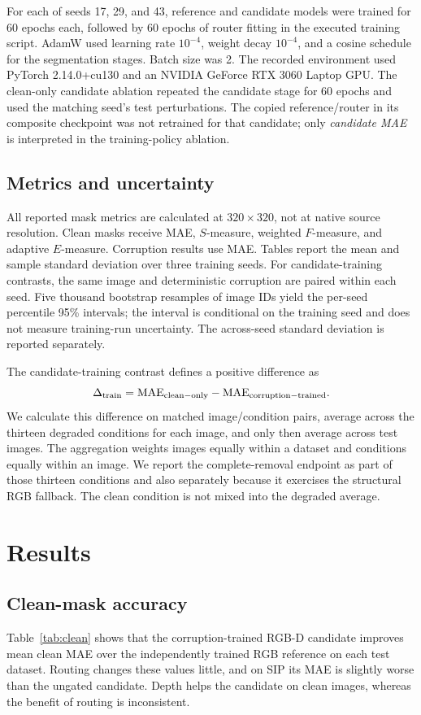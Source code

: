 \documentclass[11pt]{article}
\begin{document}
For each of seeds 17, 29, and 43, reference and candidate models were trained for 60 epochs each, followed by 60 epochs of router fitting in the executed training script. AdamW used learning rate $10^{-4}$, weight decay $10^{-4}$, and a cosine schedule for the segmentation stages. Batch size was 2. The recorded environment used PyTorch 2.14.0+cu130 and an NVIDIA GeForce RTX 3060 Laptop GPU. The clean-only candidate ablation repeated the candidate stage for 60 epochs and used the matching seed's test perturbations. The copied reference/router in its composite checkpoint was not retrained for that candidate; only \emph{candidate MAE} is interpreted in the training-policy ablation.

\subsection{Metrics and uncertainty}
All reported mask metrics are calculated at $320\times320$, not at native source resolution. Clean masks receive MAE, $S$-measure, weighted $F$-measure, and adaptive $E$-measure. Corruption results use MAE. Tables report the mean and sample standard deviation over three training seeds. For candidate-training contrasts, the same image and deterministic corruption are paired within each seed. Five thousand bootstrap resamples of image IDs yield the per-seed percentile 95\% intervals; the interval is conditional on the training seed and does not measure training-run uncertainty. The across-seed standard deviation is reported separately.

The candidate-training contrast defines a positive difference as
\begin{equation}
\Delta_{\rm train}=\mathrm{MAE}_{\rm clean-only}-\mathrm{MAE}_{\rm corruption-trained}.
\end{equation}
We calculate this difference on matched image/condition pairs, average across the thirteen degraded conditions for each image, and only then average across test images. The aggregation weights images equally within a dataset and conditions equally within an image. We report the complete-removal endpoint as part of those thirteen conditions and also separately because it exercises the structural RGB fallback. The clean condition is not mixed into the degraded average.

\section{Results}
\subsection{Clean-mask accuracy}
Table~\ref{tab:clean} shows that the corruption-trained RGB-D candidate improves mean clean MAE over the independently trained RGB reference on each test dataset. Routing changes these values little, and on SIP its MAE is slightly worse than the ungated candidate. Depth helps the candidate on clean images, whereas the benefit of routing is inconsistent.
\end{document}
